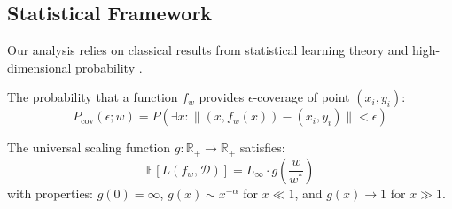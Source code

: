 \subsection{Statistical Framework}

Our analysis relies on classical results from statistical learning theory \cite{Vapnik1971ChervonenkisOT} and high-dimensional probability \cite{Papaspiliopoulos2020HighDimensionalPA}.

\begin{definition}
The probability that a function $f_w$ provides $\epsilon$-coverage of point $(x_i, y_i)$:
$$P_{\text{cov}}(\epsilon; w) = P\left(\exists x : \|(x, f_w(x)) - (x_i, y_i)\| < \epsilon\right)$$
\end{definition}

\begin{definition}
The universal scaling function $g: \mathbb{R}_+ \to \mathbb{R}_+$ satisfies:
$$\mathbb{E}[L(f_w, \mathcal{D})] = L_\infty \cdot g\left(\frac{w}{w^*}\right)$$
with properties: $g(0) = \infty$, $g(x) \sim x^{-\alpha}$ for $x \ll 1$, and $g(x) \to 1$ for $x \gg 1$.
\end{definition}